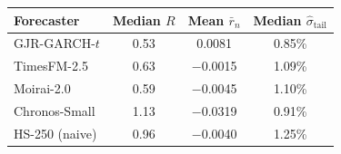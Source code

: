 \begin{tabular}{lccc}
\toprule
Forecaster & Median $R$ & Mean $\bar{r}_n$ & Median $\hat{\sigma}_{\mathrm{tail}}$ \\
\midrule
  GJR-GARCH-$t$ & 0.53 & 0.0081 & 0.85\% \\
  TimesFM-2.5 & 0.63 & $-$0.0015 & 1.09\% \\
  Moirai-2.0 & 0.59 & $-$0.0045 & 1.10\% \\
  Chronos-Small & 1.13 & $-$0.0319 & 0.91\% \\
  \midrule
  HS-250 (naive) & 0.96 & $-$0.0040 & 1.25\% \\
\bottomrule
\end{tabular}
